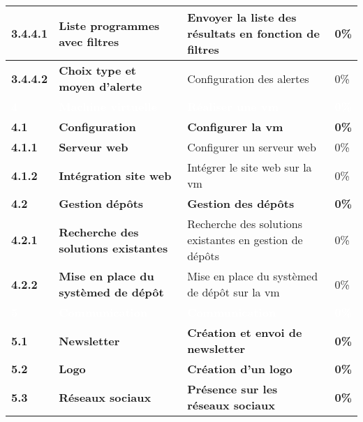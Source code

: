 \begin{supertabular}{|p{2.8cm} p{6cm}|p{5cm}|R{2cm}|}
  \hspace{12pt}
  \textbf{3.4.4.1}  & \textbf{Liste programmes avec filtres} & Envoyer la liste des résultats en fonction de filtres & 0\% \\
  \hline

  \hspace{12pt}
  \textbf{3.4.4.2}  & \textbf{Choix type et moyen d'alerte} & Configuration des alertes & 0\% \\
  \hline





  \textcolor{white}{\textbf{4}}  & \textcolor{white}{\textbf{Machine virtuelle}} & \textcolor{white}{\textbf{Réaliser une vm}} & \textcolor{white}{\textbf{0\%}} \\
  \hline

  \textbf{4.1}  & \textbf{Configuration} & \textbf{Configurer la vm} & \textbf{0\%} \\
  \hline

  \hspace{6pt}
  \textbf{4.1.1}  & \textbf{Serveur web} & Configurer un serveur web & 0\% \\
  \hline

  \hspace{6pt}
  \textbf{4.1.2}  & \textbf{Intégration site web} & Intégrer le site web sur la vm & 0\% \\
  \hline

  \textbf{4.2}  & \textbf{Gestion dépôts} & \textbf{Gestion des dépôts} & \textbf{0\%} \\
  \hline


  \hspace{6pt}
  \textbf{4.2.1}  & \textbf{Recherche des solutions existantes} & Recherche des solutions existantes en gestion de dépôts & 0\% \\
  \hline

  \hspace{6pt}
  \textbf{4.2.2}  & \textbf{Mise en place du systèmed de dépôt} &  Mise en place du systèmed de dépôt sur la vm & 0\% \\
  \hline


  \textcolor{white}{\textbf{5}}  & \textcolor{white}{\textbf{Communication}} & \textcolor{white}{\textbf{Communication}} & \textcolor{white}{\textbf{0\%}} \\
  \hline

  \textbf{5.1}  & \textbf{Newsletter} & \textbf{Création et envoi de newsletter} & \textbf{0\%} \\
  \hline

  \textbf{5.2}  & \textbf{Logo} & \textbf{Création d'un logo} & \textbf{0\%} \\
  \hline

  \textbf{5.3}  & \textbf{Réseaux sociaux} & \textbf{Présence sur les réseaux sociaux} & \textbf{0\%} \\
  \hline



\end{supertabular}
\normalsize
